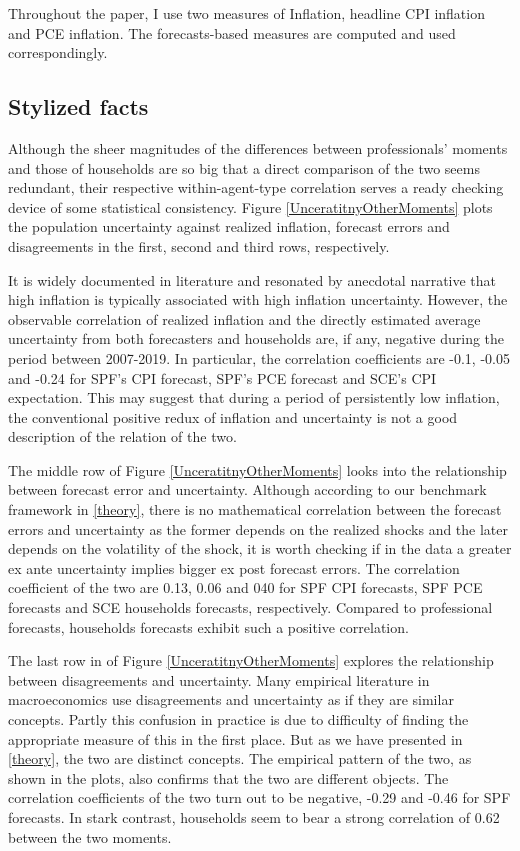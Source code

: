 \documentclass[]{article}
\begin{document}
	Throughout the paper, I use two measures of Inflation, headline CPI inflation and PCE inflation. The forecasts-based measures are computed and used correspondingly.  
	
	\subsection{Stylized facts}
	
	
	Although the sheer magnitudes of the differences between professionals' moments and those of households are so big that a direct comparison of the two seems redundant, their respective within-agent-type correlation serves a ready checking device of some statistical consistency. Figure \ref{UnceratitnyOtherMoments} plots the population uncertainty against realized inflation,  forecast errors and disagreements in the first, second and third rows, respectively. 
	
	It is widely documented in literature \cite{xxx, xxx} and resonated by anecdotal narrative that high inflation is typically associated with high inflation uncertainty. However, the observable correlation of realized inflation and the directly estimated average uncertainty from both  forecasters and households are, if any, negative during the period between 2007-2019. In particular, the correlation coefficients are -0.1, -0.05 and -0.24 for SPF's  CPI forecast, SPF's PCE forecast and SCE's CPI expectation. This may suggest that during a period of persistently low inflation, the conventional positive redux of inflation and uncertainty is not a good description of the relation of the two. 
	
	The middle row of Figure \ref{UnceratitnyOtherMoments} looks into the relationship between forecast error and uncertainty. Although according to our benchmark framework in \ref{theory}, there is no mathematical correlation between the forecast errors and uncertainty as the former depends on the realized shocks and the later depends on the volatility of the shock, it is worth checking if in the data a greater ex ante uncertainty implies bigger ex post forecast errors. The correlation coefficient of the two are 0.13, 0.06 and 040 for SPF CPI forecasts, SPF PCE forecasts and SCE households forecasts, respectively. Compared to professional forecasts, households forecasts exhibit such a positive correlation.  
	
	The last row in of Figure \ref{UnceratitnyOtherMoments} explores the relationship between disagreements and uncertainty. Many empirical literature in macroeconomics use disagreements and uncertainty as if they are similar concepts. Partly this confusion in practice is due to difficulty of finding the appropriate measure of this in the first place. But as we have presented in \ref{theory}, the two are distinct concepts. The empirical pattern of the two,  as shown in the plots, also confirms that the two are different objects. The correlation coefficients of the two turn out to be negative, -0.29 and -0.46 for SPF forecasts. In stark contrast, households seem to bear a strong correlation of 0.62 between the two moments.  
	
\end{document}
